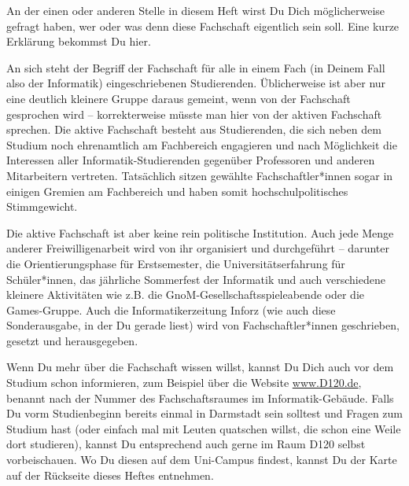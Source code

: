 {An der einen oder anderen Stelle in diesem Heft wirst Du Dich möglicherweise gefragt haben, wer oder was denn diese Fachschaft eigentlich sein soll. Eine kurze Erklärung bekommst Du hier.%
}
{An sich steht der Begriff der Fachschaft für alle in einem Fach (in Deinem Fall also der Informatik) eingeschriebenen Studierenden. Üblicherweise ist aber nur eine deutlich kleinere Gruppe daraus gemeint, wenn von der Fachschaft gesprochen wird – korrekterweise müsste man hier von der aktiven Fachschaft sprechen. Die aktive Fachschaft besteht aus Studierenden, die sich neben dem Studium noch ehrenamtlich am Fachbereich engagieren und nach Möglichkeit die Interessen aller Informatik-Studierenden gegenüber Professoren und anderen Mitarbeitern vertreten. Tatsächlich sitzen gewählte Fachschaftler*innen sogar in einigen Gremien am Fachbereich und haben somit hochschulpolitisches Stimmgewicht.

Die aktive Fachschaft ist aber keine rein politische Institution. Auch jede Menge anderer Freiwilligenarbeit wird von ihr organisiert und durchgeführt – darunter die Orientierungsphase für Erstsemester, die Universitätserfahrung für Schüler*innen, das jährliche Sommerfest der Informatik und auch verschiedene kleinere Aktivitäten wie z.B. die GnoM-Gesellschaftsspieleabende oder die Games-Gruppe. Auch die Informatikerzeitung Inforz (wie auch diese Sonderausgabe, in der Du gerade liest) wird von Fachschaftler*innen geschrieben, gesetzt und herausgegeben.

Wenn Du mehr über die Fachschaft wissen willst, kannst Du Dich auch vor dem Studium schon informieren, zum Beispiel über die Website \url{www.D120.de}, benannt nach der Nummer des Fachschaftsraumes im Informatik-Gebäude. Falls Du vorm Studienbeginn bereits einmal in Darmstadt sein solltest und Fragen zum Studium hast (oder einfach mal mit Leuten quatschen willst, die schon eine Weile dort studieren), kannst Du entsprechend auch gerne im Raum D120 selbst vorbeischauen. Wo Du diesen auf dem Uni-Campus findest, kannst Du der Karte auf der Rückseite dieses Heftes entnehmen.
}
{}

\vfill
{}
\vfill

\newpage